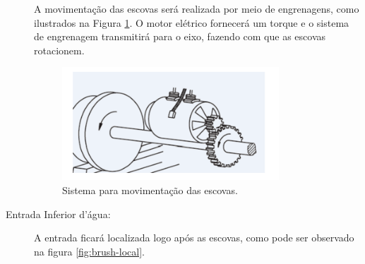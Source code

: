 \begin{description}
\FloatBarrier
\par
A movimentação das escovas será realizada por meio de engrenagens, como ilustrados
na Figura \ref{fig:brush-system}. O motor elétrico fornecerá um torque e o sistema de
engrenagem transmitirá para o eixo, fazendo com que as escovas rotacionem.
\par
\begin{figure}[h]
  \centering
  \includegraphics[width=0.8\textwidth]{figures/brush-system.png}
  \caption{Sistema para movimentação das escovas.}
  \label{fig:brush-system}
\end{figure}
\FloatBarrier

\item[Entrada Inferior d'água:] A entrada ficará localizada logo após as
escovas, como pode ser observado na figura \ref{fig:brush-local}.


\end{description}

